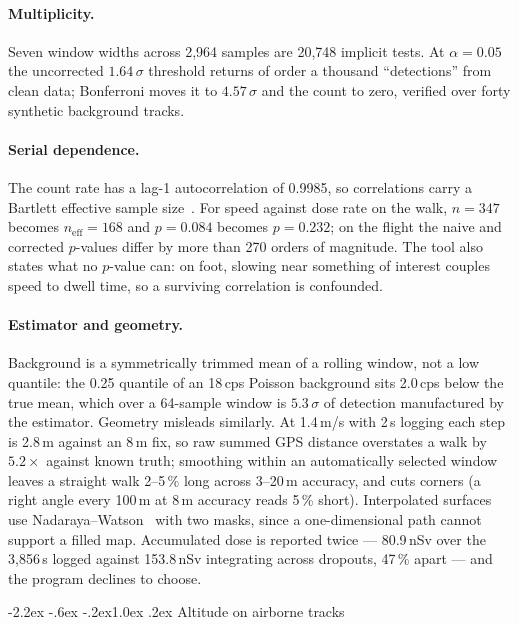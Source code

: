 \documentclass[10pt,twocolumn]{article}
\makeatletter
\renewcommand\section{\@startsection{section}{1}{\z@}%
  {-2.2ex \@plus -.6ex \@minus -.2ex}{1.0ex \@plus .2ex}%
  {\normalfont\large\bfseries}}
\makeatother
\begin{document}
\paragraph{Multiplicity.} Seven window widths across 2{,}964 samples are
20{,}748 implicit tests. At $\alpha=0.05$ the uncorrected $1.64\,\sigma$
threshold returns of order a thousand ``detections'' from clean data;
Bonferroni moves it to $4.57\,\sigma$ and the count to zero, verified over
forty synthetic background tracks.

\paragraph{Serial dependence.} The count rate has a lag-1 autocorrelation of
0.9985, so correlations carry a Bartlett effective sample
size~\cite{bartlett1946}. For speed against dose rate on the walk, $n=347$
becomes $n_\text{eff}=168$ and $p=0.084$ becomes $p=0.232$; on the flight the
naive and corrected $p$-values differ by more than 270 orders of magnitude. The tool also
states what no $p$-value can: on foot, slowing near something of interest
couples speed to dwell time, so a surviving correlation is confounded.

\paragraph{Estimator and geometry.} Background is a symmetrically trimmed mean
of a rolling window, not a low quantile: the 0.25 quantile of an 18\,cps
Poisson background sits 2.0\,cps below the true mean, which over a 64-sample
window is $5.3\,\sigma$ of detection manufactured by the estimator. Geometry
misleads similarly. At 1.4\,m/s with 2\,s logging each step is 2.8\,m against
an 8\,m fix, so raw summed GPS distance overstates a walk by $5.2\times$
against known truth; smoothing within an automatically selected window leaves
a straight walk 2--5\,\% long across 3--20\,m accuracy, and cuts corners (a
right angle every 100\,m at 8\,m accuracy reads 5\,\% short). Interpolated surfaces use
Nadaraya--Watson~\cite{nadaraya1964} with two masks, since a one-dimensional
path cannot support a filled map. Accumulated dose is reported twice ---
80.9\,nSv over the 3{,}856\,s logged against 153.8\,nSv integrating across
dropouts, 47\,\% apart --- and the program declines to choose.

\section{Altitude on airborne tracks}
\end{document}
